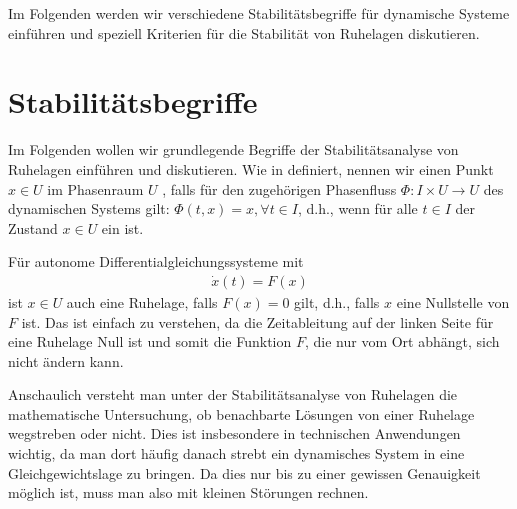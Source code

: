 \documentclass[letterpaper,10pt,german]{jupyterBook}
\begin{document}
\sphinxAtStartPar
Im Folgenden werden wir verschiedene Stabilitätsbegriffe für dynamische Systeme einführen und speziell Kriterien für die Stabilität von Ruhelagen diskutieren.


\section{Stabilitätsbegriffe}
\label{\detokenize{odestability/stabilitaetsbegriffe:stabilitatsbegriffe}}\label{\detokenize{odestability/stabilitaetsbegriffe::doc}}
\sphinxAtStartPar
Im Folgenden wollen wir grundlegende Begriffe der Stabilitätsanalyse von Ruhelagen einführen und diskutieren.
Wie in {\hyperref[\detokenize{ode/fluesse:s-fluesse}]{}} definiert, nennen wir einen Punkt \(x\in U\) im Phasenraum \(U\) , falls für den zugehörigen Phasenfluss \(\Phi \colon I \times U \rightarrow U\) des dynamischen Systems gilt: \(\Phi(t,x) = x, \forall t \in I\), d.h., wenn für alle \(t \in I\) der Zustand \(x \in U\) ein  ist.

\sphinxAtStartPar
Für autonome Differentialgleichungssysteme mit
\begin{equation*}
\begin{split}\dot{x}(t) = F(x)\end{split}
\end{equation*}
\sphinxAtStartPar
ist \(x \in U\) auch eine Ruhelage, falls \(F(x) = 0\) gilt, d.h., falls \(x\) eine Nullstelle von \(F\) ist.
Das ist einfach zu verstehen, da die Zeitableitung auf der linken Seite für eine Ruhelage Null ist und somit die Funktion \(F\), die nur vom Ort abhängt, sich nicht ändern kann.

\sphinxAtStartPar
Anschaulich versteht man unter der Stabilitätsanalyse von Ruhelagen die mathematische Untersuchung, ob benachbarte Lösungen von einer Ruhelage wegstreben oder nicht.
Dies ist insbesondere in technischen Anwendungen wichtig, da man dort häufig danach strebt ein dynamisches System in eine Gleichgewichtslage zu bringen.
Da dies nur bis zu einer gewissen Genauigkeit möglich ist, muss man also mit kleinen Störungen rechnen.
\end{document}
